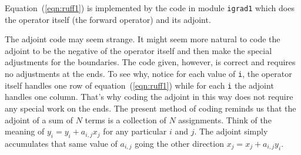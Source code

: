 Equation~(\ref{eqn:ruff1}) is implemented by the code
in module \texttt{igrad1}
which does the operator itself (the forward operator)
and its adjoint.

\par \noindent
The adjoint code may seem strange.
It might seem more natural to code the adjoint
to be the negative of the operator itself
and then make the special adjustments for the boundaries.
The code given, however, is correct and requires no adjustments
at the ends.
To see why, notice for each value of \texttt{i},
the operator itself handles one row of
equation~(\ref{eqn:ruff1})
while for each \texttt{i}
the adjoint handles one column.
That's why coding the adjoint in this way
does not require any special work on the ends.
The present method of coding reminds us that
the adjoint of a sum of $N$ terms is a collection of $N$ assignments.
Think of the meaning of
$y_i=y_i+a_{i,j}x_j$
for any particular $i$ and $j$.
The adjoint simply accumulates that same value of $a_{i,j}$
going the other direction
$x_j=x_j+a_{i,j}y_i$.


\begin{comment}
\par
The Ratfor90 dialect of Fortran
allows us to write the inner code of
the \texttt{igrad1} module more simply and symmetrically
using the syntax of C, C++, and Java
where
expressions like {\tt a=a+b} can be written more tersely as {\tt a+=b}.
With this, the heart of module \texttt{igrad1} becomes
\begin{verbatim}
if( adj) {   xx(i+1) += yy(i)
             xx(i)   -= yy(i)
           }
else {       yy(i)   += xx(i+1)
             yy(i)   -= xx(i)
           }
\end{verbatim}
where we see that each component of the matrix is handled both by the
operator and the adjoint.  Think about the forward operator
``pulling'' a sum into {\tt yy(i)}, and think about the adjoint
operator ``pushing'' or ``spraying'' the impulse {\tt yy(i)} back into
{\tt xx()}.
\end{comment}


